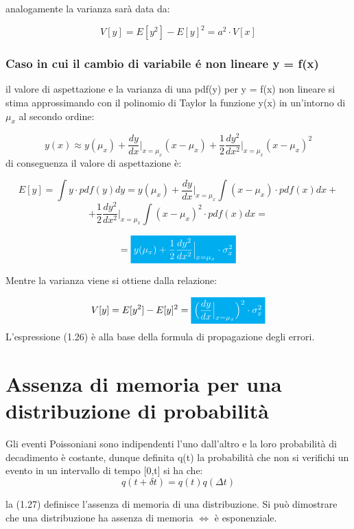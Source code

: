 \documentclass[11pt,a4paper]{book}
\begin{document}
 analogamente la varianza sar\`{a} data da:
 
 \begin{equation}
 	V[y] = E[y^2] - E[y]^2 = a^2 \cdot V[x]
 \end{equation}

 \subsubsection{Caso in cui il cambio di variabile \'{e} non lineare y = f(x)}
 
 il valore di aspettazione e la varianza di una pdf(y) per y = f(x) non lineare si stima approssimando con il polinomio di Taylor la funzione y(x) in un'intorno di $\mu_x$ al secondo ordine:
 
 \begin{equation*}
 y(x) \approx y(\mu_x) + \dfrac{dy}{dx}\Big\vert_{x = \mu_x}(x-\mu_x) + \dfrac{1}{2}\dfrac{dy^2}{dx^2}\Big\vert_{x = \mu_x}(x-\mu_x)^2
 \end{equation*}
 \newline
 di conseguenza il valore di aspettazione \`{e}:
 
\begin{equation*}
 	E[y] = \int y \cdot pdf(y)dy = y(\mu_x) + \dfrac{dy}{dx}\Big\vert_{x = \mu_x}\int{(x-\mu_x)\cdot pdf(x)dx} + 
 \end{equation*}
 \begin{equation*}
 	+ \dfrac{1}{2}\dfrac{dy^2}{dx^2}\Big\vert_{x = \mu_x} \int{(x-\mu_x)^2 \cdot pdf(x)dx} = 
 \end{equation*}
 
 \begin{equation}
 	= \colorbox{cyan}{\textcolor{white}{$y(\mu_x) + \dfrac{1}{2}\dfrac{dy^2}{dx^2}\Big\vert_{x = \mu_x} \cdot \sigma_{x}^2$}}
 \end{equation}
\newline

Mentre la varianza viene si ottiene dalla relazione:

\begin{equation}
	V[y] = E[y^2] - E[y]^2 = \colorbox{cyan}{\textcolor{white}{$\Big(\dfrac{dy}{dx}\Big \vert_{x = \mu_x}\Big)^2 \cdot \sigma_{x}^2$}} 
\end{equation}
\newline
L'espressione (1.26) \`{e} alla base della formula di propagazione degli errori.

\section{Assenza di memoria per una distribuzione di probabilit\`{a}}

Gli eventi Poissoniani sono indipendenti l'uno dall'altro e la loro probabilit\`{a} di decadimento \`{e} costante, dunque definita q(t) la probabilit\`{a} che non si verifichi un evento in un intervallo di tempo [0,t] si ha che: 
\begin{equation}
	q(t + \delta t) = q(t)q(\Delta t)	
\end{equation}

 la (1.27) definisce l'assenza di memoria di una distribuzione. Si pu\`{o} dimostrare che una distribuzione ha assenza di memoria $\iff$ \`{e} esponenziale.
\end{document}
